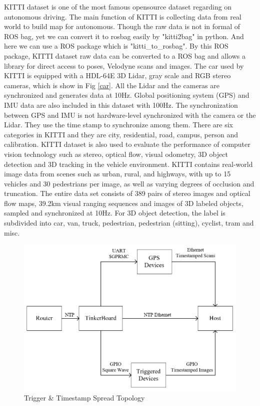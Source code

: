 \documentclass[conference]{IEEEtran}
\begin{document}
	KITTI dataset \cite{Geiger2013IJRR} is one of the most famous opensource dataset regarding on autonomous driving. The main function of KITTI is collecting data from real world to build map for autonomous. Though the raw data is not in formal of ROS bag, yet we can convert it to rosbag easily by "kitti2bag" in python. And here we can use a ROS package which is "kitti\_to\_rosbag". By this ROS package, KITTI dataset raw data can be converted to a ROS bag and allows a library for direct access to poses, Velodyne scans and images. The car used by KITTI is equipped with a HDL-64E 3D Lidar, gray scale and RGB stereo cameras, which is show in Fig \ref{car}. All the Lidar and the cameras are synchronized and generates data at 10Hz. Global positioning system (GPS) and IMU data are also included in this dataset with 100Hz. The synchronization between GPS and IMU is not hardware-level synchronized with the camera or the Lidar. They use the time stamp to synchronize among them. There are six categories in KITTI and they are city, residential, road, campus, person and calibration.	KITTI dataset is also used to evaluate the performance of computer vision technology such as stereo, optical flow, visual odometry, 3D object detection and 3D tracking in the vehicle environment. KITTI contains real-world image data from scenes such as urban, rural, and highways, with up to 15 vehicles and 30 pedestrians per image, as well as varying degrees of occlusion and truncation. The entire data set consists of 389 pairs of stereo images and optical flow maps, 39.2km visual ranging sequences and images of 3D labeled objects, sampled and synchronized at 10Hz. For 3D object detection, the label is subdivided into car, van, truck, pedestrian, pedestrian (sitting), cyclist, tram and misc.

\begin{figure}
	\centering
	\includegraphics[width=.4\textwidth]{topology.png}
	\caption{Trigger \& Timestamp Spread Topology}
	\label{topology}
\end{figure}
\end{document}
